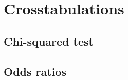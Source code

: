 %
%
%
\section{Crosstabulations}

	\subsection{Chi-squared test}%
    \label{sec:chi2}

	\subsection{Odds ratios}
